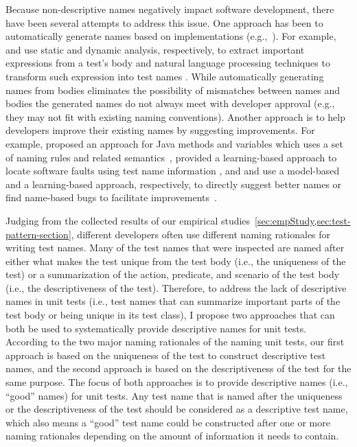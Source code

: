 Because non-descriptive names negatively impact software development, there have been several attempts to address this issue.
%
One approach has been to automatically generate names based on implementations (e.g.,~\cite{arcuri2014automated, zhang2015automatically, daka2017generating}).
%
For example, \citeauthor{zhang2015automatically} and \citeauthor{daka2017generating} use static and dynamic analysis, respectively, to extract important expressions from a test's body and natural language processing techniques to transform such expression into test names \cite{zhang2015automatically, daka2017generating}. 
%
While automatically generating names from bodies eliminates the possibility of mismatches between names and bodies the generated names do not always meet with developer approval (e.g., they may not fit with existing naming conventions).
%
Another approach is to help developers improve their existing names by suggesting improvements.
%
For example, \citeauthor{host2009debugging} proposed an approach for Java methods and variables which uses a set of naming rules and related semantics~\cite{host2009debugging}, \citeauthor{li2019deepfl} provided a learning-based approach to locate software faults using test name information \cite{li2019deepfl}, and \citeauthor{allamanis2015suggesting} and \citeauthor{pradel2018deepbugs} use a model-based and a learning-based approach, respectively, to directly suggest better names or find name-based bugs to facilitate improvements~\cite{allamanis2015suggesting, pradel2018deepbugs}.


Judging from the collected results of our empirical studies~\cref{sec:empStudy,sec:test-pattern-section}, different developers often use different naming rationales for writing test names.
%
Many of the test names that were inspected are named after either what makes the test unique from the test body (i.e., the uniqueness of the test) or a summarization of the action, predicate, and scenario of the test body (i.e., the descriptiveness of the test).
%
Therefore, to address the lack of descriptive names in unit tests (i.e., test names that can summarize important parts of the test body or being unique in its test class), I propose two approaches that can both be used to systematically provide descriptive names for unit tests.
%
According to the two major naming rationales of the naming unit tests, our first approach is based on the uniqueness of the test to construct descriptive test names, and the second approach is based on the descriptiveness of the test for the same purpose.
%
The focus of both approaches is to provide descriptive names (i.e., \enquote{good} names) for unit tests.
%
Any test name that is named after the uniqueness or the descriptiveness of the test should be considered as a descriptive test name, which also means a \enquote{good} test name could be constructed after one or more naming rationales depending on the amount of information it needs to contain.


